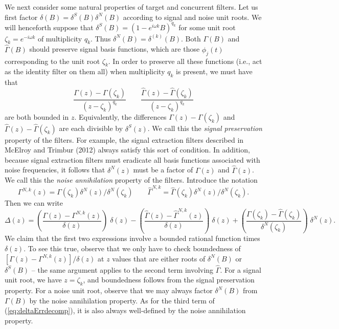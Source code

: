 \documentclass[a4paper]{book}
\begin{document}
We next consider some natural properties of target and
concurrent filters.  Let us first factor $\delta (B) = \delta^S (B)
\delta^N (B)$ according to signal and noise unit roots.  We will
henceforth suppose that $\delta^S (B) = {(1 - e^{i \omega k}
B)}^{q_k}$ for some unit root $\zeta_k = e^{-i \omega k}$ of
multiplicity $q_k$.  Thus $\delta^N (B) = \delta^{(k)} (B)$.  Both
$\Gamma (B)$ and $\widehat{\Gamma} (B)$ should preserve signal basis functions,
which are those $\phi_j (t)$ corresponding to the unit root
$\zeta_k$.  In order to preserve all these functions (i.e., act as
the identity filter on them all) when multiplicity $q_k$ is present,
we must have that
\[
 \frac{ \Gamma (z) - \Gamma (\zeta_k) }{ {( z- \zeta_k)}^{q_k} }
 \qquad  \frac{ \widehat{\Gamma} (z) - \widehat{\Gamma} (\zeta_k) }{ {( z- \zeta_k)}^{q_k} }
\]
 are both bounded in $z$.  Equivalently, the differences $\Gamma (z) - \Gamma (\zeta_k)$ and 
$  \widehat{\Gamma} (z) - \widehat{\Gamma} (\zeta_k)$ are each
 divisible by $\delta^S (z)$.  We call this the {\it  signal preservation}
 property of the filters.  For example, the signal extraction
 filters described in McElroy and Trimbur (2012) always satisfy this
 sort of condition.  In addition, because signal extraction filters
 must eradicate all basis functions associated with noise
 frequencies, it follows that $\delta^N (z)$ must be a factor of
 $\Gamma (z) $ and $\widehat{\Gamma} (z)$.  We call this the {\it noise annihilation}
 property of the filters.  Introduce the notation 
\[
 \Gamma^{N,k} (z) = \Gamma (\zeta_k)  \delta^N (z) / \delta^N
  (\zeta_k)  \qquad \widehat{\Gamma}^{N,k} =  \widehat{\Gamma} (\zeta_k)  \delta^N (z) / \delta^N
  (\zeta_k).
\]
 Then we can write
\begin{equation}
\label{eq:deltaErrdecomp}
 \Delta (z)  =
  \left( \frac{ \Gamma (z) - \Gamma^{N,k} (z) }{ \delta (z) } \right) \; \delta (z)
  - \left( \frac{ \widehat{\Gamma} (z) - \widehat{\Gamma}^{N,k} (z) }{ \delta (z) } \right) \; \delta (z)  
  + \left( \frac{ \Gamma (\zeta_k) - \widehat{\Gamma} (\zeta_k) }{ \delta^N
  (\zeta_k) } \right) \; \delta^N (z).
\end{equation}
 We claim that the first two expressions involve a bounded rational function times
 $\delta (z)$.  To see this true, observe that we only have to check
 boundedness of $[ \Gamma (z) - \Gamma^{N,k} (z) ]/\delta (z)$ at $z$ values that are either roots of
  $\delta^N (B)$ or $\delta^S (B)$ -- the same argument applies to
  the second term involving $\widehat{\Gamma}$.  For a signal unit root, we
  have $z = \zeta_k$, and boundedness follows from the signal
  preservation property.  For a noise unit root, observe that we may
  always factor $\delta^N (B)$ from $\Gamma (B)$ by the noise
  annihilation property.  As for the third term of (\ref{eq:deltaErrdecomp}), it is
  also always well-defined by the noise annihilation property.
\end{document}
